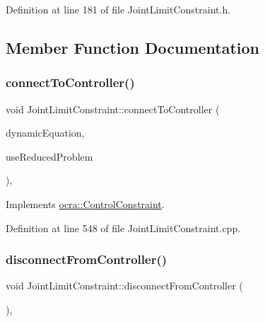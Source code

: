 Definition at line 181 of file Joint\+Limit\+Constraint.\+h.



\subsection{Member Function Documentation}
\hypertarget{classocra_1_1JointLimitConstraint_a71cfd04e493f270e44b79fb5a46c1601}{}\label{classocra_1_1JointLimitConstraint_a71cfd04e493f270e44b79fb5a46c1601} 
\subsubsection{\texorpdfstring{connect\+To\+Controller()}{connectToController()}}
{\footnotesize\ttfamily void Joint\+Limit\+Constraint\+::connect\+To\+Controller (\begin{DoxyParamCaption}\item[{const \hyperlink{classocra_1_1FullDynamicEquationFunction}{Full\+Dynamic\+Equation\+Function} \&}]{dynamic\+Equation,  }\item[{bool}]{use\+Reduced\+Problem }\end{DoxyParamCaption})\hspace{0.3cm}{\ttfamily [protected]}, {\ttfamily [virtual]}}



Implements \hyperlink{classocra_1_1ControlConstraint_a04dabdc1c469146e7b3240dfe0a5172c}{ocra\+::\+Control\+Constraint}.



Definition at line 548 of file Joint\+Limit\+Constraint.\+cpp.

\hypertarget{classocra_1_1JointLimitConstraint_a5f91d3b746f76f17f71a03b68de1f8ee}{}\label{classocra_1_1JointLimitConstraint_a5f91d3b746f76f17f71a03b68de1f8ee} 
\subsubsection{\texorpdfstring{disconnect\+From\+Controller()}{disconnectFromController()}}
{\footnotesize\ttfamily void Joint\+Limit\+Constraint\+::disconnect\+From\+Controller (\begin{DoxyParamCaption}{ }\end{DoxyParamCaption})\hspace{0.3cm}{\ttfamily [protected]}, {\ttfamily [virtual]}}



